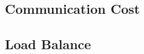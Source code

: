 \subsection{Communication Cost}\label{communication_cost}
\subsection{Load Balance}\label{load_balace}

%

